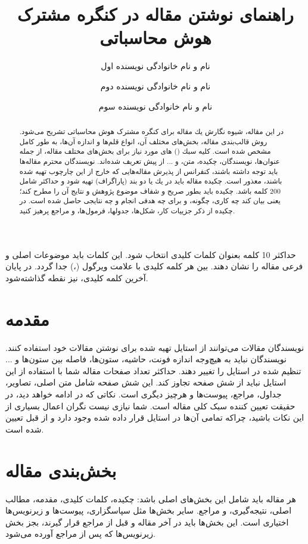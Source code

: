 \documentclass{CCI2020}
\title{
راهنمای نوشتن مقاله در کنگره مشترک هوش محاسباتی
}
\date{}
\author[1]{نام و نام خانوادگی نویسنده اول}
\author[1]{نام و نام خانوادگی نویسنده دوم}
\author[1,2]{نام و نام خانوادگی نویسنده سوم}
\affil[1]{
 رتبه علمی نویسنده در صورت تمایل، گروه آموزشی یا واحد سازمانی مربوطه، نام سازمان ، شهر،
آدرس پست الکترونیکی
}
\affil[2]{
 رتبه علمی نویسنده در صورت تمایل، گروه آموزشی یا واحد سازمانی مربوطه، نام سازمان ، شهر،
آدرس پست الکترونیکی
}
\begin{document}
\maketitle
\thispagestyle{firstpage}
\begin{abstract}
در این مقاله، شیوه نگارش یك مقاله برای کنگره مشترک هوش محاسباتی تشریح می‌شود. روش قالب‌بندی مقاله، بخش‌های مختلف آن، انواع قلم‌ها و اندازه آن‌ها، به طور كامل مشخص شده است. كلیه سبك () های مورد نیاز برای بخش‌های مختلف مقاله، از جمله عنوان‌ها، نویسندگان، چكیده، متن، و ... از پیش تعریف شده‌اند. نویسندگان محترم مقاله‌ها باید توجه داشته باشند، كنفرانس از پذیرش مقاله‌هایی كه خارج از این چارچوب تهیه شده باشند، معذور است. چكیده مقاله باید در یك یا دو بند (پاراگراف) تهیه شود و حداكثر شامل 200 كلمه باشد. چكیده باید بطور صریح و شفاف موضوع پژوهش و نتایج آن را مطرح كند؛ یعنی بیان كند چه كاری، چگونه، و برای چه هدفی انجام و چه نتایجی حاصل شده است. در چكیده از ذكر جزییات كار، شكل‌ها، جدول­ها، فرمول‌ها، و مراجع‌ پرهیز كنید.
 \end{abstract}
\begin{keywords}
حداكثر 10 كلمه بعنوان كلمات كلیدی انتخاب شود. این كلمات باید موضوعات اصلی و فرعی مقاله را نشان دهند. بین هر کلمه کلیدی با علامت ویرگول (،) جدا گردد. در پایان آخرین کلمه کلیدی، نیز نقطه گذاشته‌شود. 
\end{keywords}


\section{مقدمه}
نویسندگان مقالات می‌توانند از استایل
 \lr{\LaTeX}
  تهیه شده برای نوشتن مقالات خود استفاده کنند. نویسندگان نباید به هیچ‌وجه اندازه فونت، حاشیه، ستون‌ها، فاصله بین ستون‌ها و ... تنظیم شده در استایل را تغییر دهند. حداکثر تعداد صفحات مقاله  شما با استفاده از این استایل نباید از شش صفحه تجاوز کند. این شش صفحه شامل متن اصلی، تصاویر، جداول، مراجع، پیوست‌ها و هرچیز دیگری است. نکاتی که در ادامه خواهد دید، در حقیقت تعیین کننده سبک کلی مقاله است. شما نیازی نیست نگران اعمال بسیاری از این نکات باشید، چراکه تمامی آن‌ها در استایل 
  \lr{\LaTeX}
   قرار داده شده وجود دارد و از قبل تعیین شده است.

\section{بخش‌بندی مقاله}
هر مقاله باید شامل این بخش‌های اصلی باشد: چکیده، کلمات کلیدی، مقدمه، مطالب اصلی، نتیجه‌گیری، و مراجع. سایر بخش‌ها مثل سپاسگزاری، پیوست‌ها و زیرنویس‌ها اختیاری است. این بخش‌ها باید در آخر مقاله و قبل از مراجع قرار گیرند، بجز بخش زیر‌نویس‌ها که پس از مراجع آورده می‌شود.
\end{document}
